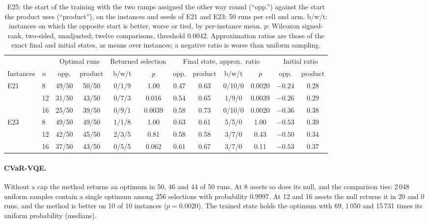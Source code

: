 \documentclass[11pt,a4paper]{article}
\begin{document}
\begin{table}[H]
\centering\footnotesize\setlength{\tabcolsep}{4pt}
\begin{tabular}{llcccccccccc}
\toprule
 & & \multicolumn{2}{c}{Optimal runs} & \multicolumn{2}{c}{Returned selection} & \multicolumn{4}{c}{Final state, approx.\ ratio} & \multicolumn{2}{c}{Initial ratio} \\
Instances & $n$ & opp. & product & b/w/t & $p$ & opp. & product & b/w/t & $p$ & opp. & product \\
\midrule
E21 & 8 & 49/50 & 50/50 & 0/1/9 & 1.00 & 0.47 & 0.63 & 0/10/0 & 0.0020 & $-0.24$ & 0.28 \\
 & 12 & 31/50 & 43/50 & 0/7/3 & 0.016 & 0.54 & 0.65 & 1/9/0 & 0.0039 & $-0.26$ & 0.29 \\
 & 16 & 25/50 & 39/50 & 0/9/1 & 0.0039 & 0.58 & 0.73 & 0/10/0 & 0.0020 & $-0.36$ & 0.38 \\
E23 & 8 & 49/50 & 49/50 & 1/1/8 & 1.00 & 0.63 & 0.61 & 5/5/0 & 1.00 & $-0.53$ & 0.39 \\
 & 12 & 42/50 & 45/50 & 2/3/5 & 0.81 & 0.58 & 0.58 & 3/7/0 & 0.43 & $-0.50$ & 0.34 \\
 & 16 & 37/50 & 43/50 & 0/5/5 & 0.062 & 0.61 & 0.67 & 3/7/0 & 0.11 & $-0.53$ & 0.37 \\
\bottomrule
\end{tabular}
\caption{E25: the start of the training with the two ramps assigned the
other way round (``opp.'') against the start the product uses
(``product''), on the instances
and seeds of E21 and E23; 50 runs per cell and arm. b/w/t: instances on
which the opposite start is better, worse or tied, by per-instance mean.
$p$: Wilcoxon signed-rank, two-sided, unadjusted; twelve comparisons,
threshold $0.0042$. Approximation ratios are those of the exact final and
initial states, as means over instances; a negative ratio is worse than
uniform sampling.}
\label{tab:initial-angles}
\end{table}

\paragraph{CVaR-VQE.} Without a cap the method returns an optimum
in 50, 46 and 44 of 50 runs. At 8 assets so does its null, and the
comparison ties: 2\,048 uniform samples contain a single optimum among 256
selections with probability $0.9997$. At 12 and 16 assets the null returns
it in 20 and 0 runs, and the method is better on 10 of 10 instances
($p = 0.0020$). The trained state holds the optimum with 69, 1\,050 and
15\,731 times its uniform probability (medians).
\end{document}
